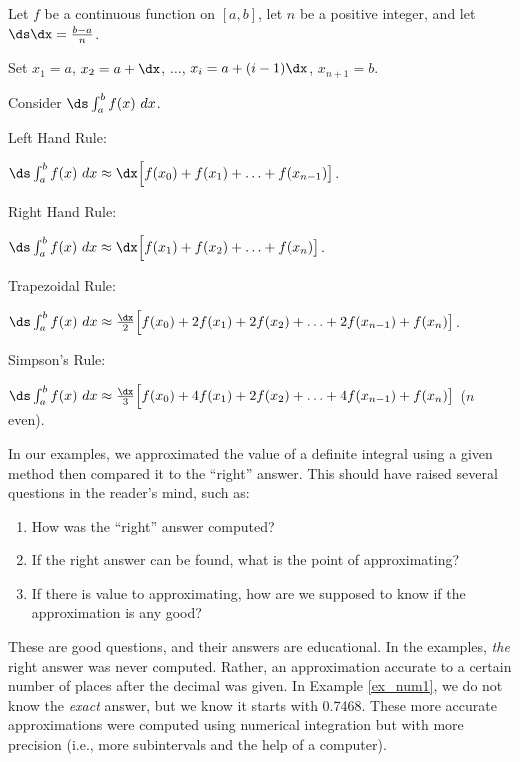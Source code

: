 \begin{formulabox} \label{idea:numerical}
{Let $f$ be a continuous function on $[a,b]$, let $n$ be a positive integer, and let $\ds\dx = \frac{b-a}{n}$. 

Set $x_1=a$, $x_2 = a+\dx$, $\ldots$, $x_i = a+(i-1)\dx$, $x_{n+1}=b$.

Consider $\ds\int_a^b f(x)\ dx$. 

\parbox{75pt}{Left Hand Rule:} $\ds\int_a^b f(x)\ dx \approx \dx\Big[f(x_0) + f(x_1) + \ldots + f(x_{n-1})\big]$.\\

\parbox{75pt}{Right Hand Rule:} $\ds\int_a^b f(x)\ dx \approx \dx\Big[f(x_1) + f(x_2) + \ldots + f(x_{n})\big]$.\\

\parbox{75pt}{Trapezoidal Rule:} $\ds\int_a^b f(x)\ dx \approx \frac{\dx}2\Big[f(x_0) + 2f(x_1) + 2f(x_2) +\ldots + 2f(x_{n-1})+ f(x_{n})\big]$.\\

\parbox{75pt}{Simpson's Rule:} $\ds\int_a^b f(x)\ dx \approx \frac{\dx}3\Big[f(x_0) + 4f(x_1) + 2f(x_2) +\ldots + 4f(x_{n-1})+ f(x_{n})\big]$ {\small ($n$ even)}.
} 
\end{formulabox}


In our examples, we approximated the value of a definite integral using a given method then compared it to the ``right'' answer. This should have raised several questions in the reader's mind, such as:
\begin{enumerate}
\item		How was the ``right'' answer computed?
\item		If the right answer can be found, what is the point of approximating?
\item		If there is value to approximating, how are we supposed to know if the approximation is any good?
\end{enumerate}

These are good questions, and their answers are educational. In the examples, \textit{the} right answer was never computed. Rather, an approximation accurate to a certain number of places after the decimal was given. In Example \ref{ex_num1}, we do not know the \textit{exact} answer, but we know it starts with 0.7468. These more accurate approximations were computed using numerical integration but with more precision (i.e., more subintervals and the help of a computer). 

